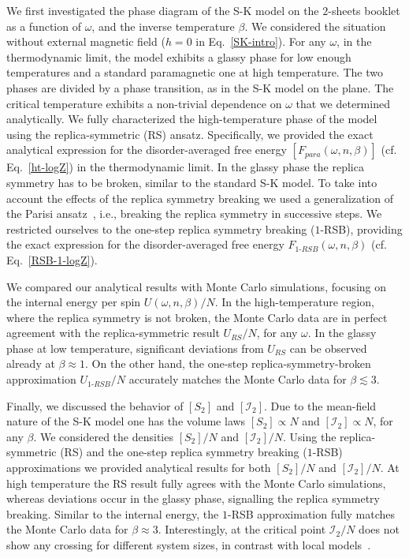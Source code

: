 \documentclass[twocolumn,superscriptaddress,prb,10pt]{revtex4-1}
\begin{document}
We first investigated the phase diagram of the S-K model on the $2$-sheets booklet as a 
function of $\omega$, and the inverse temperature $\beta$. We considered the situation 
without external magnetic field ($h=0$ in Eq.~\eqref{SK-intro}). For any $\omega$, in the 
thermodynamic limit, the model exhibits a glassy phase for low enough temperatures and 
a standard paramagnetic one at high temperature. The two phases are divided 
by a phase transition, as in the S-K model on the plane. The critical temperature exhibits 
a non-trivial dependence on $\omega$ that we determined analytically. We fully characterized 
the high-temperature phase of the model using the replica-symmetric (RS) ansatz. Specifically, 
we provided the exact analytical expression for the disorder-averaged free energy 
$[F_{para}(\omega,n,\beta)]$  (cf. Eq.~\eqref{ht-logZ}) in the thermodynamic limit. In the 
glassy phase the replica symmetry has to be broken, similar to the standard S-K model. To take 
into account the effects of the replica symmetry breaking we used a generalization of the 
Parisi ansatz~\cite{parisi-1980}, i.e., breaking the replica symmetry in successive steps. 
We restricted ourselves to the one-step replica symmetry breaking ($1$-RSB), providing the 
exact expression for the disorder-averaged free energy $F_{1\textrm{-}RSB}(\omega,n,\beta)$ 
(cf. Eq.~\eqref{RSB-1-logZ}). 

We compared our analytical results with Monte Carlo simulations, focusing on the internal 
energy per spin $U(\omega,n,\beta)/N$. In the high-temperature region, where the replica 
symmetry is not broken, the Monte Carlo data are in perfect agreement with the replica-symmetric 
result $U_{RS}/N$, for any $\omega$. In the glassy phase at low temperature, significant 
deviations from $U_{RS}$ can be observed already at $\beta\approx 1$. On the other hand, 
the one-step replica-symmetry-broken approximation $U_{1\textrm{-}RSB}/N$ accurately matches 
the Monte Carlo data for $\beta\lesssim 3$. 

Finally, we discussed the behavior of $[S_2]$ and $[{\mathcal I}_2]$. Due to the mean-field 
nature of the S-K model one has the volume laws $[S_2]\propto N$ and $[{\mathcal I}_2]\propto N$, 
for any $\beta$. We considered the densities $[S_2]/N$ and $[{\mathcal I}_2]/N$. Using the 
replica-symmetric (RS) and the one-step replica symmetry breaking ($1$-RSB) approximations we 
provided analytical results for both $[S_2]/N$ and $[{\mathcal I}_2]/N$. At high temperature the 
RS result fully agrees with the Monte Carlo simulations, whereas deviations occur in the 
glassy phase, signalling the replica symmetry breaking. Similar to the internal energy, 
the $1$-RSB approximation fully matches the Monte Carlo data for $\beta\approx 3$.
Interestingly, at the critical point ${\mathcal I}_2/N$ does not show any crossing for 
different system sizes, in contrast with local models~\cite{jaconis-2013}.
\end{document}
